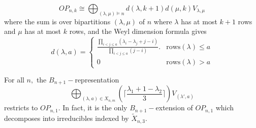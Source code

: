 \documentclass[10pt,a4paper]{amsart}
\begin{document}
\begin{proposition}\label{OPdecomp}
   $$
        OP_{n, k} \cong \bigoplus_{(\lambda,\mu) \vDash n} d(\lambda, k+1) d(\mu, k) V_{\lambda,\mu}
   $$
    where the sum is over bipartitions $(\lambda,\mu)$ of $n$ where $\lambda$ has at most $k+1$ rows and $\mu$ has at most $k$ rows, and the Weyl dimension formula gives
    $$d(\lambda,a)=\begin{cases} \frac{\prod_{i < j \leq a} (\lambda_i - \lambda_j+j-i)}{\prod_{i<j \leq a}{(j-i)}}. & \text{rows}(\lambda)\le a \\
    0 & \text{rows}(\lambda)>a\end{cases}$$
\end{proposition}

\begin{theorem} \label{thm:OPn1Thm}
For all $n,$ the $B_{n+1}-$representation
$$\bigoplus_{(\lambda,a)\in X_{n,m}}  (\lceil \frac{\lambda_1 + 1 - \lambda_2}{3} \rceil ) V_{(\lambda',a)}$$
restricts to $OP_{n, 1}.$ In fact, it is the only $B_{n+1}-$extension of $OP_{n,1}$ which decomposes into irreducibles indexed by $\tilde{X}_{n,3}.$ 
\end{theorem}
\end{document}
